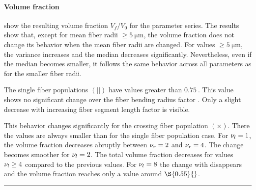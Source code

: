 \paragraph{Volume fraction}
% 
 show the resulting volume fraction $V_f/V_0$ for the parameter series.
The results show that, except for mean fiber radii $\geq \SI{5}{\micro\meter}$, the volume fraction does not change its behavior when the mean fiber radii are changed.
For values $\geq \SI{5}{\micro\meter}$, the variance increases and the median decreases significantly.
Nevertheless, even if the median becomes smaller, it follows the same behavior across all parameters as for the smaller fiber radii.
\par
% 
The single fiber populations $(||)$ have values greater than $\SI{0.75}{}$.
This value shows no significant change over the fiber bending radius factor \segRadiusFactor{}.
Only a slight decrease with increasing fiber segment length factor \segLengthFactor{} is visible.
\par
% 
This behavior changes significantly for the crossing fiber population $(\times)$.
There the values are always smaller than for the single fiber population case.
For $\textnormal{$\nu_{l}$}{}=\SI{1}{}$, the volume fraction decreases abruptly between $\textnormal{$\nu_{r}$}{} = \SI{2}{}$ and $\textnormal{$\nu_{r}$}{} = \SI{4}{}$. 
The change becomes smoother for $\textnormal{$\nu_{l}$}{}=\SI{2}{}$.
The total volume fraction decreases for values $\textnormal{$\nu_{l}$}{} \geq \SI{4}{}$ compared to the previous values.
For $\textnormal{$\nu_{l}$}{}=\SI{8}{}$ the change with \segRadiusFactor{} disappears and the volume fraction reaches only a value around $\S{0.55}{}$.
% 
% 
% 
\par
\noindent\rule{\textwidth}{2pt}
\par 
% 
